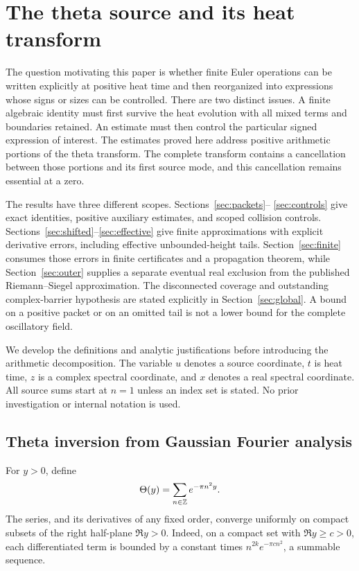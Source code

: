 \section{The theta source and its heat transform}\label{sec:theta}

The question motivating this paper is whether finite Euler operations can
be written explicitly at positive heat time and then reorganized into
expressions whose signs or sizes can be controlled. There are two distinct
issues. A finite algebraic identity must first survive the heat evolution
with all mixed terms and boundaries retained. An estimate must then control
the particular signed expression of interest. The estimates proved here
address positive arithmetic portions of the theta transform. The complete
transform contains a cancellation between those portions and its first
source mode, and this cancellation remains essential at a zero.

The results have three different scopes. Sections~\ref{sec:packets}--%
\ref{sec:controls} give exact identities, positive auxiliary estimates,
and scoped collision controls. Sections~\ref{sec:shifted}--\ref{sec:effective}
give finite approximations with explicit derivative errors, including
effective unbounded-height tails. Section~\ref{sec:finite} consumes those
errors in finite certificates and a propagation theorem, while
Section~\ref{sec:outer} supplies a separate eventual real exclusion
from the published Riemann--Siegel approximation.
The disconnected coverage and outstanding complex-barrier hypothesis
are stated explicitly in Section~\ref{sec:global}. A bound on a positive
packet or on an omitted tail is not a lower bound for the complete
oscillatory field.

We develop the definitions and analytic justifications before introducing
the arithmetic decomposition. The variable $u$ denotes a source coordinate,
$t$ is heat time, $z$ is a complex spectral coordinate, and $x$ denotes a
real spectral coordinate. All source sums start at $n=1$ unless an index set
is stated. No prior investigation or internal notation is used.

\subsection{Theta inversion from Gaussian Fourier analysis}

For $y>0$, define
\begin{equation}\label{eq:theta}
 \Theta(y)=\sum_{n\in\mathbb Z}e^{-\pi n^2y}.
\end{equation}
The series, and its derivatives of any fixed order, converge uniformly
on compact subsets of the right half-plane $\Re y>0$. Indeed, on a compact
set with $\Re y\ge c>0$, each differentiated term is bounded by a constant
times $n^{2k}e^{-\pi c n^2}$, a summable sequence.

